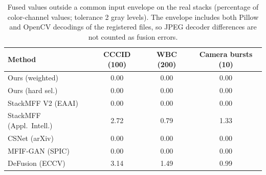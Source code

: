 \begin{table}[htbp]
\centering
\scriptsize
\caption{Fused values outside a common input envelope on the real stacks (percentage of color-channel values; tolerance 2 gray levels). The envelope includes both Pillow and OpenCV decodings of the registered files, so JPEG decoder differences are not counted as fusion errors.}
\label{tab:range}
\begin{tabular}{lccc}
\toprule
Method & CCCID (100) & WBC (200) & Camera bursts (10) \\
\midrule
Ours (weighted) & 0.00 & 0.00 & 0.00 \\
Ours (hard sel.) & 0.00 & 0.00 & 0.00 \\
StackMFF V2 (EAAI)~\cite{xie2025stackmffv2} & 0.00 & 0.00 & 0.00 \\
StackMFF (Appl.\ Intell.)~\cite{xie2025stackmff} & 2.72 & 0.79 & 1.33 \\
CSNet (arXiv)~\cite{csnet2026} & 0.00 & 0.00 & 0.00 \\
MFIF-GAN (SPIC)~\cite{wang2021mfifgan} & 0.00 & 0.00 & 0.00 \\
DeFusion (ECCV)~\cite{liang2022defusion} & 3.14 & 1.49 & 0.99 \\
\bottomrule
\end{tabular}
\end{table}
